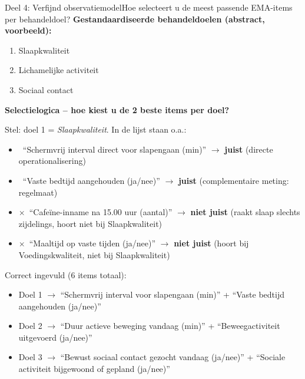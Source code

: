 \documentclass[11pt,a4paper]{article}
\begin{document}
\begin{voorbeeldbox}{Deel 4: Verfijnd observatiemodel}{Hoe selecteert u de meest passende EMA-items per behandeldoel?}
\small
\textbf{Gestandaardiseerde behandeldoelen (abstract, voorbeeld):}
\begin{enumerate}[topsep=2pt,itemsep=1pt,label=\arabic*.]
\item Slaapkwaliteit
\item Lichamelijke activiteit
\item Sociaal contact
\end{enumerate}

\textbf{Selectielogica -- hoe kiest u de 2 beste items per doel?}

Stel: doel 1 = \textit{Slaapkwaliteit}. In de lijst staan o.a.:
\begin{itemize}[topsep=2pt,itemsep=1pt]
\item \checkmark\ ``Schermvrij interval direct voor slapengaan (min)'' $\rightarrow$ \textbf{juist} (directe operationalisering)
\item \checkmark\ ``Vaste bedtijd aangehouden (ja/nee)'' $\rightarrow$ \textbf{juist} (complementaire meting: regelmaat)
\item $\times$\ ``Cafeïne-inname na 15.00 uur (aantal)'' $\rightarrow$ \textbf{niet juist} (raakt slaap slechts zijdelings, hoort niet bij Slaapkwaliteit)
\item $\times$\ ``Maaltijd op vaste tijden (ja/nee)'' $\rightarrow$ \textbf{niet juist} (hoort bij Voedingskwaliteit, niet bij Slaapkwaliteit)
\end{itemize}

\medskip
Correct ingevuld (6 items totaal):
\begin{itemize}[topsep=1pt,itemsep=0pt]
\item Doel 1 $\rightarrow$ ``Schermvrij interval voor slapengaan (min)'' + ``Vaste bedtijd aangehouden (ja/nee)''
\item Doel 2 $\rightarrow$ ``Duur actieve beweging vandaag (min)'' + ``Beweegactiviteit uitgevoerd (ja/nee)''
\item Doel 3 $\rightarrow$ ``Bewust sociaal contact gezocht vandaag (ja/nee)'' + ``Sociale activiteit bijgewoond of gepland (ja/nee)''
\end{itemize}
\end{voorbeeldbox}

\vspace{0.5em}
\end{document}
